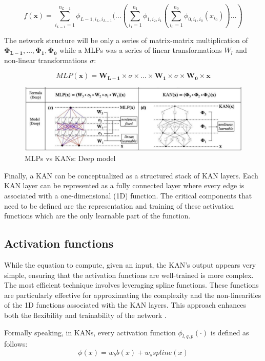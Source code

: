 \documentclass[12pt,a4paper]{article}
\begin{document}
$$f(\textbf{x}) = \sum_{i_{L-1}=1}^{n_{L-1}}  \phi_{L-1,i_L,i_{L-1}} (...(\sum_{i_1=1}^{n_{1}}  \phi_{1,i_2,i_{1}}(\sum_{i_0=1}^{n_{0}}  \phi_{0,i_1,i_{0}}(x_{i_0}))...)$$

The network structure will be only a series of matrix-matrix multiplication of $ \boldsymbol{\Phi_{L-1}}, \dots, \boldsymbol{\Phi_{1}},\boldsymbol{\Phi_{0}}$  while a MLPs was a series of linear transformations $W_l$ and non-linear transformations $\sigma$:

$$MLP(\textbf{x}) = \boldsymbol{W_{L-1}} \times \sigma \times \dots \times \boldsymbol{W_{1}} \times \sigma \times\boldsymbol{W_{0}} \times \textbf{x}$$

\begin{figure}[H]
    \centering
    \includegraphics[width=0.8\linewidth]{Images/B.JPG}
    \caption{ MLPs vs KANs: Deep model }
\end{figure}

Finally, a KAN can be conceptualized as a structured stack of KAN layers. Each KAN layer can be represented as a fully connected layer where every edge is associated with a one-dimensional (1D) function. The critical components that need to be defined are the representation and training of these activation functions which are the only learnable part of the function.

\subsection{Activation functions}
While the equation to compute, given an input, the KAN's output appears very simple, ensuring that the activation functions are well-trained is more complex. The most efficient technique involves leveraging spline functions. These functions are particularly effective for approximating the complexity and the non-linearities of the 1D functions associated with the KAN layers. This approach enhances both the flexibility and trainability of the network \cite{KAN}.

Formally speaking, in KANs, every activation function $\phi_{l,q,p}(\cdot)$ is defined as follows:
$$\phi(x) = w_bb(x) + w_sspline(x) $$
\end{document}
